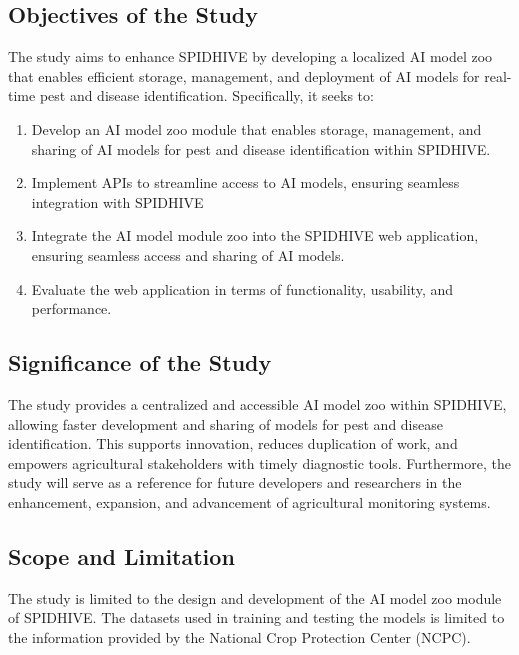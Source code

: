 \documentclass{icsthesis}
\begin{document}
\begin{mainmatter}
            \subsection{Objectives of the Study}
            The study aims to enhance SPIDHIVE by developing a localized AI model zoo that enables efficient storage, management, and deployment of AI models for real-time pest and disease identification. Specifically, it seeks to:
            
            \begin{enumerate}
                \item Develop an AI model zoo module that enables storage, management, and sharing of AI models for pest and disease identification within SPIDHIVE.
                \item Implement APIs to streamline access to AI models, ensuring seamless integration with SPIDHIVE
                \item Integrate the AI model module zoo into the SPIDHIVE web application, ensuring seamless access and sharing of AI models.
                \item Evaluate the web application in terms of functionality, usability, and performance.
            \end{enumerate}
            
            \subsection{Significance of the Study}
            The study provides a centralized and accessible AI model zoo within SPIDHIVE, allowing faster development and sharing of models for pest and disease identification. This supports innovation, reduces duplication of work, and empowers agricultural stakeholders with timely diagnostic tools. Furthermore, the study will serve as a reference for future developers and researchers in the enhancement, expansion, and advancement of agricultural monitoring systems. 
            
            \subsection{Scope and Limitation}
            The study is limited to the design and development of the AI model zoo module of SPIDHIVE. The datasets used in training and testing the models is limited to the information provided by the National Crop Protection Center (NCPC). 


\end{mainmatter}
\end{document}
